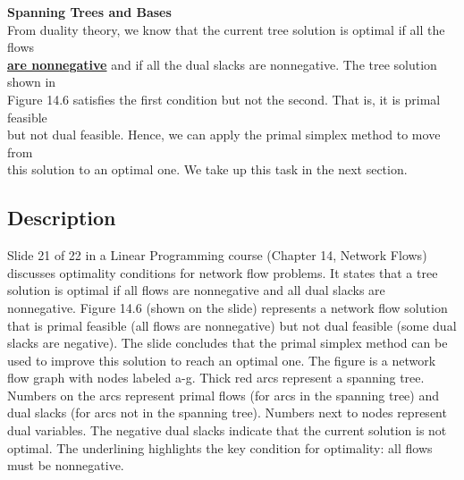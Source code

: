 \documentclass{article}%
\begin{document}
\textbf{Spanning Trees and Bases} \\
From duality theory, we know that the current tree solution is optimal if all the flows \\
\underline{\textbf{are nonnegative}} and if all the dual slacks are nonnegative. The tree solution shown in \\
Figure 14.6 satisfies the first condition but not the second. That is, it is primal feasible \\
but not dual feasible. Hence, we can apply the primal simplex method to move from \\
this solution to an optimal one. We take up this task in the next section.
%
\subsection{Description}%
Slide 21 of 22 in a Linear Programming course (Chapter 14, Network Flows) discusses optimality conditions for network flow problems. It states that a tree solution is optimal if all flows are nonnegative and all dual slacks are nonnegative.  Figure 14.6 (shown on the slide) represents a network flow solution that is primal feasible (all flows are nonnegative) but not dual feasible (some dual slacks are negative).  The slide concludes that the primal simplex method can be used to improve this solution to reach an optimal one. The figure is a network flow graph with nodes labeled a-g.  Thick red arcs represent a spanning tree. Numbers on the arcs represent primal flows (for arcs in the spanning tree) and dual slacks (for arcs not in the spanning tree). Numbers next to nodes represent dual variables.  The negative dual slacks indicate that the current solution is not optimal. The underlining highlights the key condition for optimality: all flows must be nonnegative.%
\end{document}
